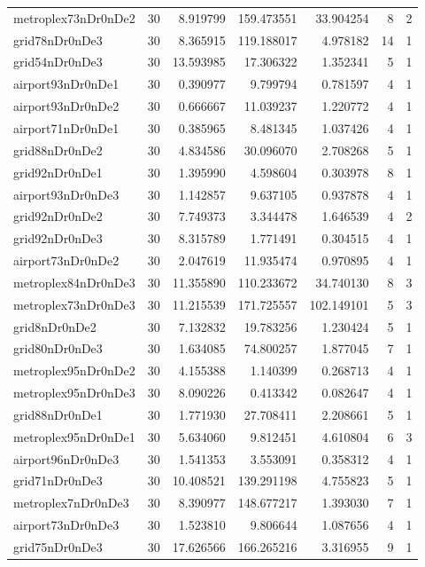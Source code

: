 \documentclass[../../../thesis.tex]{subfiles}
\begin{document}
\begin{longtable}{|l|r|r|r|r|r|r|}
metroplex73nDr0nDe2 & 30 & 8.919799 & 159.473551 & 33.904254 & 8 & 2 \\
grid78nDr0nDe3 & 30 & 8.365915 & 119.188017 & 4.978182 & 14 & 1 \\
grid54nDr0nDe3 & 30 & 13.593985 & 17.306322 & 1.352341 & 5 & 1 \\
airport93nDr0nDe1 & 30 & 0.390977 & 9.799794 & 0.781597 & 4 & 1 \\
airport93nDr0nDe2 & 30 & 0.666667 & 11.039237 & 1.220772 & 4 & 1 \\
airport71nDr0nDe1 & 30 & 0.385965 & 8.481345 & 1.037426 & 4 & 1 \\
grid88nDr0nDe2 & 30 & 4.834586 & 30.096070 & 2.708268 & 5 & 1 \\
grid92nDr0nDe1 & 30 & 1.395990 & 4.598604 & 0.303978 & 8 & 1 \\
airport93nDr0nDe3 & 30 & 1.142857 & 9.637105 & 0.937878 & 4 & 1 \\
grid92nDr0nDe2 & 30 & 7.749373 & 3.344478 & 1.646539 & 4 & 2 \\
grid92nDr0nDe3 & 30 & 8.315789 & 1.771491 & 0.304515 & 4 & 1 \\
airport73nDr0nDe2 & 30 & 2.047619 & 11.935474 & 0.970895 & 4 & 1 \\
metroplex84nDr0nDe3 & 30 & 11.355890 & 110.233672 & 34.740130 & 8 & 3 \\
metroplex73nDr0nDe3 & 30 & 11.215539 & 171.725557 & 102.149101 & 5 & 3 \\
grid8nDr0nDe2 & 30 & 7.132832 & 19.783256 & 1.230424 & 5 & 1 \\
grid80nDr0nDe3 & 30 & 1.634085 & 74.800257 & 1.877045 & 7 & 1 \\
metroplex95nDr0nDe2 & 30 & 4.155388 & 1.140399 & 0.268713 & 4 & 1 \\
metroplex95nDr0nDe3 & 30 & 8.090226 & 0.413342 & 0.082647 & 4 & 1 \\
grid88nDr0nDe1 & 30 & 1.771930 & 27.708411 & 2.208661 & 5 & 1 \\
metroplex95nDr0nDe1 & 30 & 5.634060 & 9.812451 & 4.610804 & 6 & 3 \\
airport96nDr0nDe3 & 30 & 1.541353 & 3.553091 & 0.358312 & 4 & 1 \\
grid71nDr0nDe3 & 30 & 10.408521 & 139.291198 & 4.755823 & 5 & 1 \\
metroplex7nDr0nDe3 & 30 & 8.390977 & 148.677217 & 1.393030 & 7 & 1 \\
airport73nDr0nDe3 & 30 & 1.523810 & 9.806644 & 1.087656 & 4 & 1 \\
grid75nDr0nDe3 & 30 & 17.626566 & 166.265216 & 3.316955 & 9 & 1 \\

\end{longtable}
\end{document}
